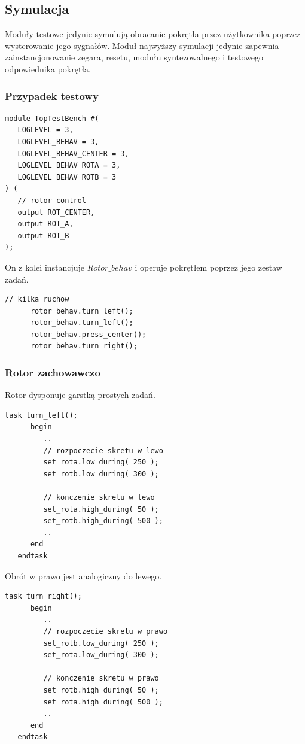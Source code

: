 \documentclass[a4paper,12pt]{article}
\begin{document}
\subsection{Symulacja}
Moduły testowe jedynie symulują obracanie pokrętła przez użytkownika poprzez wysterowanie jego sygnałów. Moduł najwyższy symulacji jedynie zapewnia zainstancjonowanie zegara, resetu, modułu syntezowalnego i testowego odpowiednika pokrętła.

\subsubsection{Przypadek testowy}


\begin{lstlisting}[label=TopTestBench,caption=TopTestBench.v]
module TopTestBench #(
   LOGLEVEL = 3,
   LOGLEVEL_BEHAV = 3,
   LOGLEVEL_BEHAV_CENTER = 3,
   LOGLEVEL_BEHAV_ROTA = 3,
   LOGLEVEL_BEHAV_ROTB = 3
) (
   // rotor control
   output ROT_CENTER,
   output ROT_A,
   output ROT_B
);
\end{lstlisting}
On z kolei instancjuje $Rotor\_behav$ i operuje pokrętłem poprzez jego zestaw zadań.
\begin{lstlisting}[label=TopTestBench,caption=TopTestBench.v,firstnumber=37]
      // kilka ruchow
      rotor_behav.turn_left();
      rotor_behav.turn_left();
      rotor_behav.press_center();
      rotor_behav.turn_right();
\end{lstlisting}

\subsubsection{Rotor zachowawczo}

Rotor dysponuje garstką prostych zadań.
\begin{lstlisting}[label=Rotor_behav,caption=Rotor\_behav.v]
   task turn_left();
      begin
         ..
         // rozpoczecie skretu w lewo
         set_rota.low_during( 250 );
         set_rotb.low_during( 300 );

         // konczenie skretu w lewo
         set_rota.high_during( 50 );
         set_rotb.high_during( 500 );
         ..
      end
   endtask
\end{lstlisting}

Obrót w prawo jest analogiczny do lewego.
\begin{lstlisting}[label=Rotor_behav,caption=Rotor\_behav.v]
   task turn_right();
      begin
         ..
         // rozpoczecie skretu w prawo
         set_rotb.low_during( 250 );
         set_rota.low_during( 300 );

         // konczenie skretu w prawo
         set_rotb.high_during( 50 );
         set_rota.high_during( 500 );
         ..
      end
   endtask
\end{lstlisting}
\end{document}
